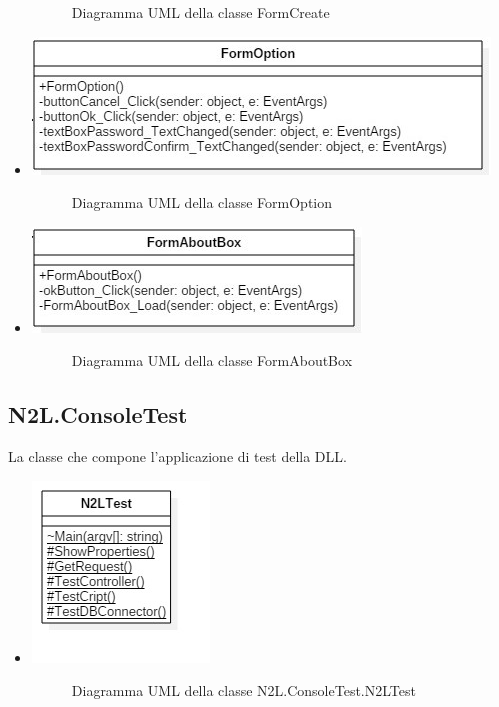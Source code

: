 \documentclass[a4paper,10pt]{report}
\begin{document}
\begin{itemize}
{\begin{center}
						\end{center}
					\begin{figure}[!h]
						\caption{Diagramma UML della classe FormCreate}
						\end{figure}}
				\item[] {
					\begin{center}
						\includegraphics[width = \textwidth]{immagini/FormOption.jpg}
						\end{center}
					\begin{figure}[!h]
						\caption{Diagramma UML della classe FormOption}
						\end{figure}}
				\item[] {
					\begin{center}
						\includegraphics[scale=1]{immagini/FormAboutBox.jpg}
						\end{center}
					\begin{figure}[!h]
						\caption{Diagramma UML della classe FormAboutBox}
						\end{figure}}
				\end{itemize}
		\newpage
		\subsection{N2L.ConsoleTest}
			La classe che compone l'applicazione di test della DLL.
				\begin{itemize}
					\item[] {
						\begin{center}
							\includegraphics[scale=0.7]{immagini/N2LTestClasses.jpg}
							\end{center}
						\begin{figure}[!h]
							\caption{Diagramma UML della classe N2L.ConsoleTest.N2LTest}
							\end{figure}}
					\end{itemize}
		\newpage
\end{document}
